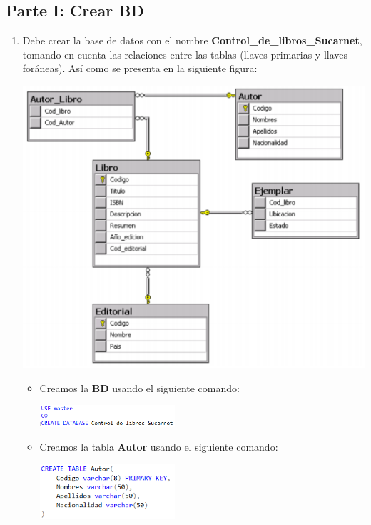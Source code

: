 \documentclass[12pt,letterpaper]{article}
\newcommand\tab[1][1cm]{\hspace*{#1}}
\begin{document}
    \subsection{Parte I: Crear BD}
    \begin{enumerate}[\tab 1.]
        \item Debe crear la base de datos con el nombre \textbf{Control\_de\_libros\_Sucarnet}, tomando en cuenta las relaciones entre las tablas (llaves primarias y llaves foráneas). Así como se presenta en la siguiente figura:\\[0.1in]
        \begin{center}
            \includegraphics[width=13cm]{./img/img1.png}
        \end{center}
        \begin{itemize}
            \item Creamos la \textbf{BD} usando el siguiente comando:
            \begin{center}
                \includegraphics[width=5cm]{./img/img1.1.png}
            \end{center}
            \item Creamos la tabla \textbf{Autor} usando el siguiente comando:
            \begin{center}
                \includegraphics[width=5cm]{./img/img1.2.png}

\end{center}
\end{itemize}
\end{enumerate}
\end{document}
